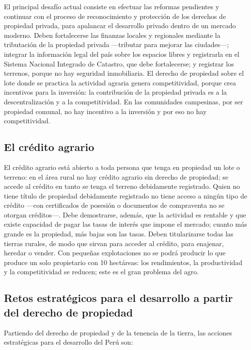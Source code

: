 \documentclass[
  man,
  floatsintext,
  longtable,
  a4paper,
  nolmodern,
  notxfonts,
  notimes,
  12pt,
  colorlinks=true,linkcolor=blue,citecolor=blue,urlcolor=blue]{apa7}
\begin{document}
El principal desafío actual consiste en efectuar las reformas pendientes
y continuar con el proceso de reconocimiento y protección de los
derechos de propiedad privada, para apalancar el desarrollo privado
dentro de un mercado moderno. Deben fortalecerse las finanzas locales y
regionales mediante la tributación de la propiedad privada ---tributar
para mejorar las ciudades---; integrar la información legal del país
sobre los espacios libres y registrarla en el Sistema Nacional Integrado
de Catastro, que debe fortalecerse; y registrar los terrenos, porque no
hay seguridad inmobiliaria. El derecho de propiedad sobre el lote donde
se practica la actividad agraria genera competitividad, porque crea
incentivos para la inversión: la contribución de la propiedad privada es
a la descentralización y a la competitividad. En las comunidades
campesinas, por ser propiedad comunal, no hay incentivo a la inversión y
por eso no hay competitividad.

\subsection{El crédito agrario}\label{el-cruxe9dito-agrario}

El crédito agrario está abierto a toda persona que tenga en propiedad un
lote o terreno: en el área rural no hay crédito agrario sin derecho de
propiedad; se accede al crédito en tanto se tenga el terreno debidamente
registrado. Quien no tiene título de propiedad debidamente registrado no
tiene acceso a ningún tipo de crédito ---con certificados de posesión o
documentos de compraventa no se otorgan créditos---. Debe demostrarse,
además, que la actividad es rentable y que existe capacidad de pagar las
tasas de interés que impone el mercado; cuanto más grande es la
propiedad, más bajas son las tasas. Deben titularizarse todas las
tierras rurales, de modo que sirvan para acceder al crédito, para
enajenar, heredar o vender. Con pequeñas explotaciones no se podrá
producir lo que produce un solo propietario con 10 hectáreas: los
rendimientos, la productividad y la competitividad se reducen; este es
el gran problema del agro.

\subsection{Retos estratégicos para el desarrollo a partir del derecho
de
propiedad}\label{retos-estratuxe9gicos-para-el-desarrollo-a-partir-del-derecho-de-propiedad}

Partiendo del derecho de propiedad y de la tenencia de la tierra, las
acciones estratégicas para el desarrollo del Perú son:
\end{document}
